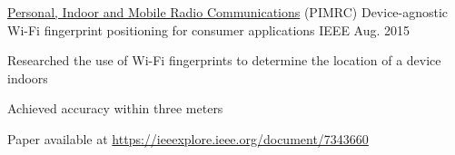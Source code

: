 \begin{cventries}
  \cventry
    {\href{http://pimrc2019.ieee-pimrc.org}{Personal, Indoor and Mobile Radio Communications} (PIMRC)}
    {Device-agnostic Wi-Fi fingerprint positioning for consumer applications}
    {IEEE}
    {Aug. 2015}
    {
      \begin{cvitems}
      \item {Researched the use of Wi-Fi fingerprints to determine the location of a device indoors}
      \item {Achieved accuracy within three meters}
      \item {Paper available at \url{https://ieeexplore.ieee.org/document/7343660}}
      \end{cvitems}
    }
\end{cventries}
